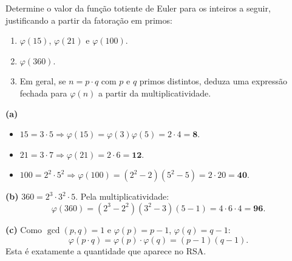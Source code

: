 \documentclass[12pt,a4paper]{article}
\begin{document}
\begin{exercicio}
Determine o valor da fun\c{c}\~{a}o totiente de Euler para os inteiros a seguir, justificando a partir da fatora\c{c}\~{a}o em primos:
\begin{enumerate}[label=(\alph*)]
    \item $\varphi(15)$, $\varphi(21)$ e $\varphi(100)$.
    \item $\varphi(360)$.
    \item Em geral, se $n = p \cdot q$ com $p$ e $q$ primos distintos, deduza uma express\~{a}o fechada para $\varphi(n)$ a partir da multiplicatividade.
\end{enumerate}

\begin{resposta}
\textbf{(a)}
\begin{itemize}[leftmargin=1.4em,topsep=2pt,itemsep=1pt]
    \item $15 = 3 \cdot 5 \Rightarrow \varphi(15) = \varphi(3)\varphi(5) = 2 \cdot 4 = \mathbf{8}.$
    \item $21 = 3 \cdot 7 \Rightarrow \varphi(21) = 2 \cdot 6 = \mathbf{12}.$
    \item $100 = 2^2 \cdot 5^2 \Rightarrow \varphi(100) = (2^2 - 2)(5^2 - 5) = 2 \cdot 20 = \mathbf{40}.$
\end{itemize}

\textbf{(b)} $360 = 2^3 \cdot 3^2 \cdot 5$. Pela multiplicatividade:
\[
\varphi(360) = (2^3 - 2^2)(3^2 - 3)(5 - 1) = 4 \cdot 6 \cdot 4 = \mathbf{96}.
\]

\textbf{(c)} Como $\gcd(p,q) = 1$ e $\varphi(p) = p-1$, $\varphi(q) = q-1$:
\[
\varphi(p \cdot q) = \varphi(p) \cdot \varphi(q) = (p-1)(q-1).
\]
Esta \'{e} exatamente a quantidade que aparece no RSA.
\end{resposta}
\end{exercicio}
\end{document}
